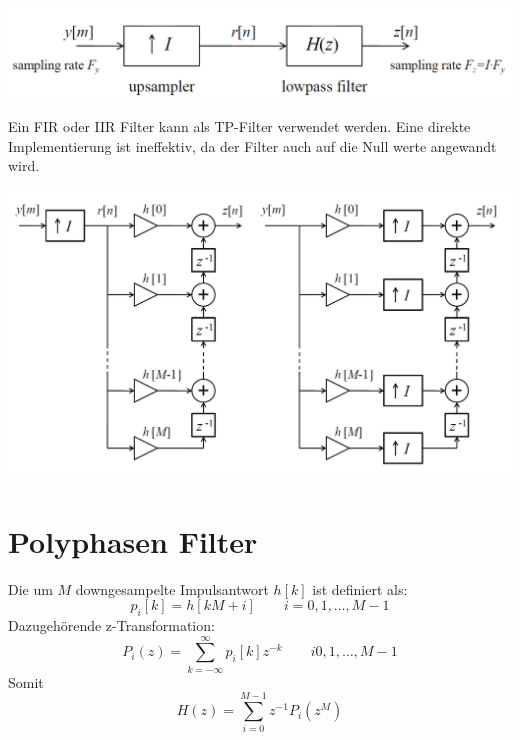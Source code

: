 \begin{center}
	\includegraphics[scale=.7]{./images/interpolation}
\end{center}
Ein FIR oder IIR Filter kann als TP-Filter verwendet werden. Eine direkte
Implementierung ist ineffektiv, da der Filter auch auf die Null werte angewandt
wird.
\begin{center}
	\includegraphics[scale=.7]{./images/interpolation_scheme}
\end{center}

\section{Polyphasen Filter}
Die um $M$ downgesampelte Impulsantwort $h[k]$ ist definiert als:
\[ p_i[k] = h[kM+i] \qquad i=0,1,\ldots,M-1 \]
Dazugehörende z-Transformation:
\[ P_i(z) = \sum_{k=-\infty}^{\infty} p_i[k]z^{-k} \qquad i0,1,\ldots,M-1 \]
Somit
\[ H(z) = \sum_{i=0}^{M-1}z^{-1} P_i(z^M) \]

